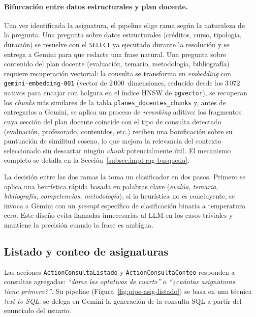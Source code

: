 \paragraph{Bifurcación entre datos estructurales y plan docente.} Una vez identificada la asignatura, el pipeline elige rama según la naturaleza de la pregunta. Una pregunta sobre datos estructurales (créditos, curso, tipología, duración) se resuelve con el \texttt{SELECT} ya ejecutado durante la resolución y se entrega a Gemini para que redacte una frase natural. Una pregunta sobre contenido del plan docente (evaluación, temario, metodología, bibliografía) requiere recuperación vectorial: la consulta se transforma en \textit{embedding} con \texttt{gemini-embedding-001} (vector de 2\,000~dimensiones, reducido desde los 3\,072 nativos para encajar con holgura en el índice HNSW de \texttt{pgvector}), se recuperan los \textit{chunks} más similares de la tabla \texttt{planes\_docentes\_chunks} y, antes de entregarlos a Gemini, se aplica un proceso de \textit{reranking} aditivo: los fragmentos cuya sección del plan docente coincide con el tipo de consulta detectado (evaluación, profesorado, contenidos, etc.) reciben una bonificación sobre su puntuación de similitud coseno, lo que mejora la relevancia del contexto seleccionado sin descartar ningún \textit{chunk} potencialmente útil. El mecanismo completo se detalla en la Sección~\ref{subsec:impl-rag-busqueda}.

La decisión entre las dos ramas la toma un clasificador en dos pasos. Primero se aplica una heurística rápida basada en palabras clave (\textit{evalúa}, \textit{temario}, \textit{bibliografía}, \textit{competencias}, \textit{metodología}); si la heurística no es concluyente, se invoca a Gemini con un \textit{prompt} específico de clasificación binaria a temperatura cero. Este diseño evita llamadas innecesarias al LLM en los casos triviales y mantiene la precisión cuando la frase es ambigua.

\subsection{Listado y conteo de asignaturas}

Las acciones \texttt{ActionConsultaListado} y \texttt{ActionConsultaConteo} responden a consultas agregadas: \textit{``dame las optativas de cuarto''} o \textit{``¿cuántas asignaturas tiene primero?''}. Su pipeline (Figura~\ref{fig:pipe-asig-listado}) se basa en una técnica \textit{text-to-SQL}: se delega en Gemini la generación de la consulta SQL a partir del enunciado del usuario.

